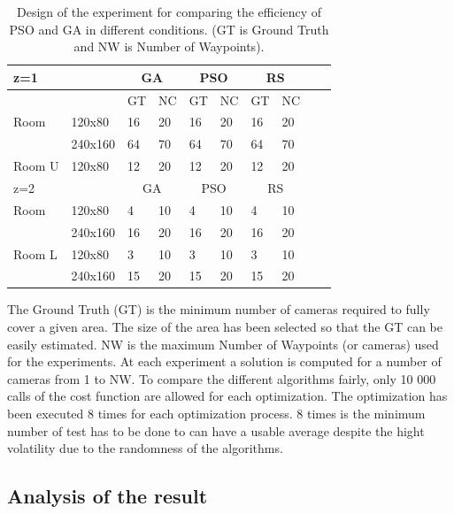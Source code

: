 \begin{table} [!htb]
\begin{tabular}{|l|l|l|l|l|l|l|l|l|l|}
  \hline
  \multicolumn{2}{|l|}{z=1 } &\multicolumn{2}{|c|}{GA}  & \multicolumn{2}{|c|}{PSO} & \multicolumn{2}{|c|}{RS}  \\  \hline
  \multicolumn{2}{|c|}{ } & GT & NC & GT & NC & GT & NC\\ \hline
  Room &  120x80 & 16 &20 & 16 & 20 & 16 & 20\\ \cline{2-8}
     &  240x160 & 64 &70 & 64 & 70 & 64 & 70 \\ \hline
  Room U &  120x80 & 12 &20 & 12 & 20 & 12 & 20\\ \hline
  \multicolumn{2}{|l|}{z=2 } &\multicolumn{2}{|c|}{GA}  & \multicolumn{2}{|c|}{PSO}& \multicolumn{2}{|c|}{RS}  \\  \hline
 Room &  120x80 & 4 &10 & 4 & 10 & 4 & 10\\ \cline{2-8}
     &  240x160 & 16 &20 & 16 & 20 & 16 & 20 \\ \hline
 Room L&  120x80 & 3 &10 & 3 & 10 & 3 & 10\\ \cline{2-8}
     &  240x160 & 15 &20 & 15 & 20 & 15 & 20 \\ \hline
  
\end{tabular}
\caption{Design of the experiment for comparing the efficiency of PSO and GA in different conditions.  (GT is Ground Truth and NW is Number of Waypoints).}\label{table:table1}

\end{table}

The Ground Truth (GT) is the minimum number of cameras required to fully cover a given area. The size of the area has been selected so that the GT can be easily estimated. 
NW is the maximum Number of Waypoints (or cameras) used for the experiments.  
At each experiment a solution is computed for a number of cameras from 1 to NW. To compare the different algorithms fairly, only 10 000 calls of the cost function are allowed for each optimization.
The optimization has been executed 8 times for each optimization process. 8 times is the minimum number of test has to be done to can have a usable average despite the hight volatility due to the randomness of the algorithms.\\ %


\subsection{ Analysis of the result }

